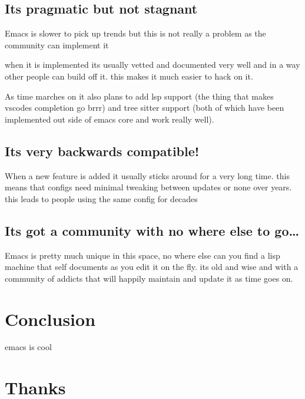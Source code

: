 \documentclass[a4paper]{article}
\begin{document}
\subsection*{Its pragmatic but not stagnant}
\label{sec:org1e3e0cc}
\begin{notes}
Emacs is slower to pick up trends but this is not really a problem as
the community can implement it

when it is implemented its usually vetted and documented very well and in a way
other people can build off it. this makes it much easier to hack on it.

As time marches on it also plans to add lsp support (the thing that makes
vscodes completion go brrr) and tree sitter support (both of which have been
implemented out side of emacs core and work really well).
\end{notes}

\subsection*{Its very backwards compatible!}
\label{sec:org0c3667e}
\begin{notes}
When a new feature is added it usually sticks around for a very long time. this
means that configs need minimal tweaking between updates or none over years.
this leads to people using the same config for decades
\end{notes}

\subsection*{Its got a community with no where else to go\ldots{}}
\label{sec:org75ad836}
\begin{notes}
Emacs is pretty much unique in this space, no where else can you find a lisp
machine that self documents as you edit it on the fly. its old and wise and with
a community of addicts that will happily maintain and update it as time goes on.
\end{notes}

\section*{Conclusion}
\label{sec:org75e4cb2}
\begin{notes}
emacs is cool
\end{notes}

\section*{Thanks}
\label{sec:org230a0b5}
\end{document}
